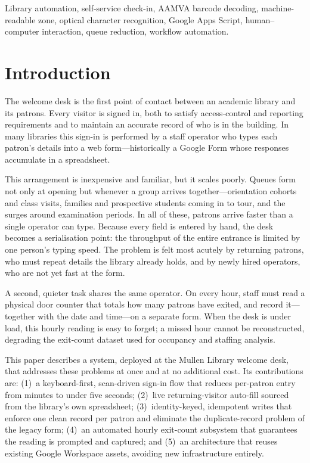 \documentclass[conference]{IEEEtran}
\begin{document}
\begin{IEEEkeywords}
Library automation, self-service check-in, AAMVA barcode decoding, machine-readable zone, optical character recognition, Google Apps Script, human--computer interaction, queue reduction, workflow automation.
\end{IEEEkeywords}

\section{Introduction}
The welcome desk is the first point of contact between an academic library and its patrons. Every visitor is signed in, both to satisfy access-control and reporting requirements and to maintain an accurate record of who is in the building. In many libraries this sign-in is performed by a staff operator who types each patron's details into a web form---historically a Google Form whose responses accumulate in a spreadsheet.

This arrangement is inexpensive and familiar, but it scales poorly. Queues form not only at opening but whenever a group arrives together---orientation cohorts and class visits, families and prospective students coming in to tour, and the surges around examination periods. In all of these, patrons arrive faster than a single operator can type. Because every field is entered by hand, the desk becomes a serialisation point: the throughput of the entire entrance is limited by one person's typing speed. The problem is felt most acutely by returning patrons, who must repeat details the library already holds, and by newly hired operators, who are not yet fast at the form.

A second, quieter task shares the same operator. On every hour, staff must read a physical door counter that totals how many patrons have exited, and record it---together with the date and time---on a separate form. When the desk is under load, this hourly reading is easy to forget; a missed hour cannot be reconstructed, degrading the exit-count dataset used for occupancy and staffing analysis.

This paper describes a system, deployed at the Mullen Library welcome desk, that addresses these problems at once and at no additional cost. Its contributions are: (1)~a keyboard-first, scan-driven sign-in flow that reduces per-patron entry from minutes to under five seconds; (2)~live returning-visitor auto-fill sourced from the library's own spreadsheet; (3)~identity-keyed, idempotent writes that enforce one clean record per patron and eliminate the duplicate-record problem of the legacy form; (4)~an automated hourly exit-count subsystem that guarantees the reading is prompted and captured; and (5)~an architecture that reuses existing Google Workspace assets, avoiding new infrastructure entirely.
\end{document}
